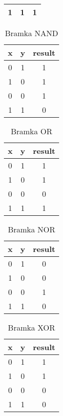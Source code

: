 \documentclass[a4paper]{article}
\begin{document}
\begin{center}
\begin{table}[H]
\begin{tabular}{|c|c|c|}
             \hline
             1&1&1\\
             \hline
             \end{tabular}
    \end{table}
\begin{table}[h]
        \centering\caption{Bramka NAND}
        \begin{tabular}{|c|c|c|}
            \hline
             x&y&result  \\
             \hline
             0&1&1 \\
             \hline
             1&0&1 \\
             \hline
             0&0&1\\
             \hline
             1&1&0\\
             \hline
             \end{tabular}
    \end{table}
\begin{table}[h]
        \centering\caption{Bramka OR}
        \begin{tabular}{|c|c|c|}
            \hline
             x&y&result  \\
             \hline
             0&1&1 \\
             \hline
             1&0&1 \\
             \hline
             0&0&0\\
             \hline
             1&1&1\\
             \hline
             \end{tabular}
    \end{table}
\begin{table}[h]
        \centering\caption{Bramka NOR}
        \begin{tabular}{|c|c|c|}
            \hline
             x&y&result  \\
             \hline
             0&1&0 \\
             \hline
             1&0&0 \\
             \hline
             0&0&1\\
             \hline
             1&1&0\\
             \hline
             \end{tabular}
    \end{table}
    \newpage
\begin{table}[]
        \centering\caption{Bramka XOR}
        \begin{tabular}{|c|c|c|}
            \hline
             x&y&result  \\
             \hline
             0&1&1 \\
             \hline
             1&0&1 \\
             \hline
             0&0&0\\
             \hline
             1&1&0\\
             \hline
             \end{tabular}
    \end{table}
    

\end{center}
\end{document}
